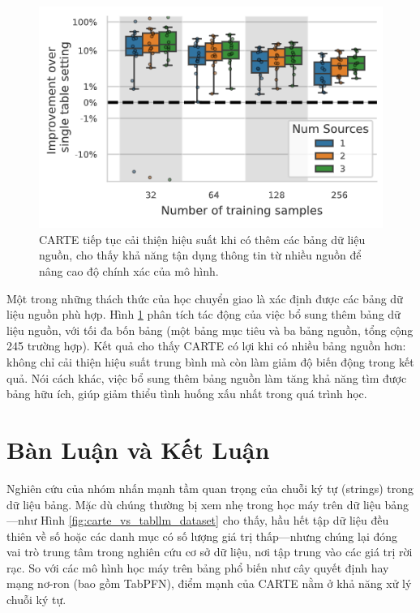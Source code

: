 \documentclass{article}
\begin{document}
\begin{figure} 
    \centering
    \includegraphics[scale = 0.8]{carte_benefits_from_additional_source_tables.png}
    \caption{CARTE tiếp tục cải thiện hiệu suất khi có thêm các bảng dữ liệu nguồn, cho thấy khả năng tận dụng thông tin từ nhiều nguồn để nâng cao độ chính xác của mô hình.}
    \label{fig:carte_benefits_from_additional_source_tables}
\end{figure}

Một trong những thách thức của học chuyển giao là xác định được các bảng dữ liệu nguồn phù hợp. Hình \ref{fig:carte_benefits_from_additional_source_tables} phân tích tác động của việc bổ sung thêm bảng dữ liệu nguồn, với tối đa bốn bảng (một bảng mục tiêu và ba bảng nguồn, tổng cộng 245 trường hợp). Kết quả cho thấy CARTE có lợi khi có nhiều bảng nguồn hơn: không chỉ cải thiện hiệu suất trung bình mà còn làm giảm độ biến động trong kết quả. Nói cách khác, việc bổ sung thêm bảng nguồn làm tăng khả năng tìm được bảng hữu ích, giúp giảm thiểu tình huống xấu nhất trong quá trình học.

\section{Bàn Luận và Kết Luận}
Nghiên cứu của nhóm nhấn mạnh tầm quan trọng của chuỗi ký tự (strings) trong dữ liệu bảng. Mặc dù chúng thường bị xem nhẹ trong học máy trên dữ liệu bảng—như Hình \ref{fig:carte_vs_tabllm_dataset} cho thấy, hầu hết tập dữ liệu đều thiên về số hoặc các danh mục có số lượng giá trị thấp—nhưng chúng lại đóng vai trò trung tâm trong nghiên cứu cơ sở dữ liệu, nơi tập trung vào các giá trị rời rạc. So với các mô hình học máy trên bảng phổ biến như cây quyết định hay mạng nơ-ron (bao gồm TabPFN), điểm mạnh của CARTE nằm ở khả năng xử lý chuỗi ký tự.
\end{document}
